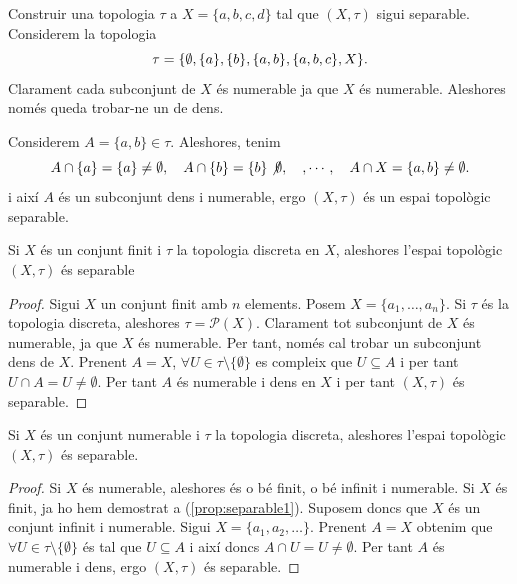 \documentclass[../main.tex]{subfiles}
\begin{document}
\begin{ej}
\label{ej:3} Construir una topologia $\tau$ a $X = \{a,b,c,d\}$ tal que $(X,\tau)$ sigui separable. Considerem la topologia
\begin{equation}
    \notag
    \tau = \{\emptyset,\{a\},\{b\},\{a,b\},\{a,b,c\},X\}. 
\end{equation}
Clarament cada subconjunt de $X$ és numerable ja que $X$ és numerable. Aleshores només queda trobar-ne un de dens.

Considerem $A = \{a,b\}\in\tau$. Aleshores, tenim
\begin{equation}
    \notag
    A\cap\{a\} = \{a\}\not=\emptyset,\quad A\cap\{b\}=\{b\}\not\emptyset,\quad,\cdots,\quad A\cap X = \{a,b\}\not=\emptyset.
\end{equation}
i així $A$ és un subconjunt dens i numerable, ergo $(X,\tau)$ és un espai topològic separable.
\end{ej}

\begin{prop}
[Exemple]\label{prop:separable1} Si $X$ és un conjunt finit i $\tau$ la topologia discreta en $X$, aleshores l'espai topològic $(X,\tau)$ és separable
\end{prop}
\begin{proof}
Sigui $X$ un conjunt finit amb $n$ elements. Posem $X = \{a_1,\ldots,a_n\}$. Si $\tau$ és la topologia discreta, aleshores $\tau = \mathscr{P}(X)$. Clarament tot subconjunt de $X$ és numerable, ja que $X$ és numerable. Per tant, només cal trobar un subconjunt dens de $X$. Prenent $A = X$, $\forall U\in\tau\setminus\{\emptyset\}$ es compleix que $U\subseteq A$ i per tant $U\cap A = U\not=\emptyset$. Per tant $A$ és numerable i dens en $X$ i per tant $(X,\tau)$ és separable.
\end{proof}

\begin{prop}[Exemple]
\label{prop:separable2} Si $X$ és un conjunt numerable i $\tau$ la topologia discreta, aleshores l'espai topològic $(X,\tau)$ és separable.
\end{prop}
\begin{proof}
Si $X$ és numerable, aleshores és o bé finit, o bé infinit i numerable. Si $X$ és finit, ja ho hem demostrat a (\ref{prop:separable1}). Suposem doncs que $X$ és un conjunt infinit i numerable. Sigui $X = \{a_1,a_2,\ldots\}$. Prenent $A = X$ obtenim que $\forall U\in\tau\setminus\{\emptyset\}$ és tal que $U\subseteq A$ i així doncs $A\cap U = U\not=\emptyset$. Per tant $A$ és numerable i dens, ergo $(X,\tau)$ és separable.
\end{proof}
\end{document}
